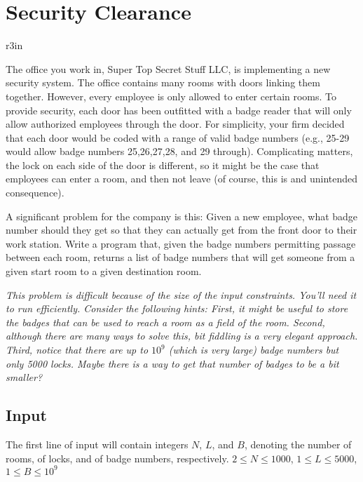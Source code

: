 \documentclass[11pt]{article}
\begin{document}
\section*{Security Clearance}


\begin{wrapfigure}{r}{3in}
\vspace{-10pt}
\vspace{-30pt}
\end{wrapfigure}

The office you work in, Super Top Secret Stuff LLC, is implementing a new security system. The office contains many rooms with doors linking them together. However, every employee is only allowed to enter certain rooms. To provide security, each door has been outfitted with a badge reader that will only allow authorized employees through the door. For simplicity, your firm decided that each door would be coded with a range of valid badge numbers (e.g., 25-29 would allow badge numbers 25,26,27,28, and 29 through). Complicating matters, the lock on each side of the door is different, so it might be the case that employees can enter a room, and then not leave (of course, this is and unintended consequence).

A significant problem for the company is this: Given a new employee, what badge number should they get so that they can actually get from the front door to their work station. Write a program that, given the badge numbers permitting passage between each room, returns a list of badge numbers that will get someone from a given start room to a given destination room.

\emph{This problem is difficult because of the size of the input constraints. You'll need it to run efficiently. Consider the following hints: First, it might be useful to store the badges that can be used to reach a room as a field of the room. Second, although there are many ways to solve this, bit fiddling is a very elegant approach. Third, notice that there are up to $10^9$ (which is very large) badge numbers but only 5000 locks. Maybe there is a way to get that number of badges to be a bit smaller?}

\subsection*{Input}
The first line of input will contain integers $N$, $L$, and $B$, denoting the number of rooms, of locks, and of badge numbers, respectively. $2 \leq N \leq 1000$, $1 \leq L \leq 5000$, $1 \leq B \leq 10^9$
\end{document}
